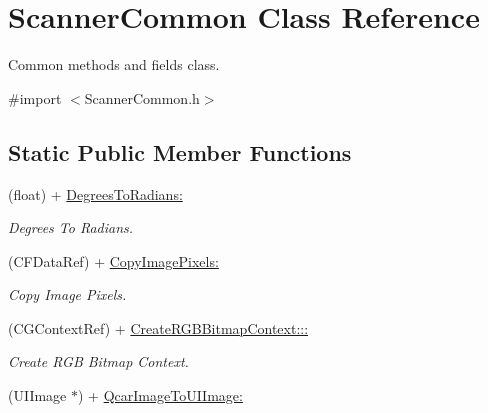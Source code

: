 \hypertarget{interface_scanner_common}{
\section{\-Scanner\-Common \-Class \-Reference}
\label{interface_scanner_common}
}


\-Common methods and fields class.  




{\ttfamily \#import $<$\-Scanner\-Common.\-h$>$}

\subsection*{\-Static \-Public \-Member \-Functions}
\begin{DoxyCompactItemize}
\item 
\hypertarget{interface_scanner_common_a59e0ef2e0753d0537af27d5f34e7e0f3}{
(float) + \hyperlink{interface_scanner_common_a59e0ef2e0753d0537af27d5f34e7e0f3}{\-Degrees\-To\-Radians\-:}}
\label{interface_scanner_common_a59e0ef2e0753d0537af27d5f34e7e0f3}

\begin{DoxyCompactList}\small\item\em \-Degrees \-To \-Radians. \end{DoxyCompactList}\item 
\hypertarget{interface_scanner_common_ad28f69ab727f0112a44884b8b56b0e15}{
(\-C\-F\-Data\-Ref) + \hyperlink{interface_scanner_common_ad28f69ab727f0112a44884b8b56b0e15}{\-Copy\-Image\-Pixels\-:}}
\label{interface_scanner_common_ad28f69ab727f0112a44884b8b56b0e15}

\begin{DoxyCompactList}\small\item\em \-Copy \-Image \-Pixels. \end{DoxyCompactList}\item 
\hypertarget{interface_scanner_common_a97cc533ca4f6f6dd0a3577664199eeec}{
(\-C\-G\-Context\-Ref) + \hyperlink{interface_scanner_common_a97cc533ca4f6f6dd0a3577664199eeec}{\-Create\-R\-G\-B\-Bitmap\-Context\-:::}}
\label{interface_scanner_common_a97cc533ca4f6f6dd0a3577664199eeec}

\begin{DoxyCompactList}\small\item\em \-Create \-R\-G\-B \-Bitmap \-Context. \end{DoxyCompactList}\item 
\hypertarget{interface_scanner_common_a48e19ae6ac81949d8f5e622a936fb824}{
(\-U\-I\-Image $\ast$) + \hyperlink{interface_scanner_common_a48e19ae6ac81949d8f5e622a936fb824}{\-Qcar\-Image\-To\-U\-I\-Image\-:}}
\label{interface_scanner_common_a48e19ae6ac81949d8f5e622a936fb824}


\end{DoxyCompactItemize}

